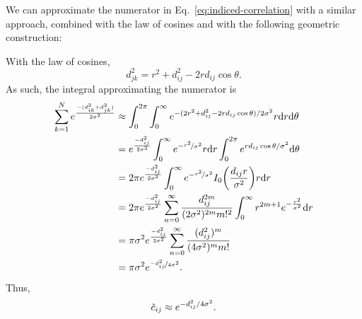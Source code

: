 \documentclass{article}
\begin{document}
We can approximate the numerator in Eq.~\eqref{eq:indiced-correlation} with a similar approach, combined with the law of cosines and with the following geometric construction:
%
\begin{center}
\end{center}

With the law of cosines, 
\begin{equation*}
    d_{jk}^2 = r^2+d_{ij}^2-2rd_{ij}\cos\theta.
\end{equation*}
As such, the integral approximating the numerator is
\begin{align*}
    \sum_{k = 1}^N e^{\frac{-(d_{ik}^2+d_{jk}^2)}{2\sigma^2}} &\approx \int_{0}^{2\pi}\int_0^{\infty}e^{-(2r^2+d_{ij}^2-2rd_{ij}\cos\theta)/2\sigma^2}r\dd r\dd \theta\\
    &= e^{\frac{-d_{ij}^2}{2\sigma^2}}\int_0^{\infty}e^{-\nicefrac{r^2}{\sigma^2}}r\dd r\int_{0}^{2\pi}e^{rd_{ij}\cos\theta/\sigma^2}\dd \theta\\
    &= 2\pi e^{\frac{-d_{ij}^2}{2\sigma^2}}\int_0^{\infty}e^{-\nicefrac{r^2}{\sigma^2}}I_0\qty(\frac{d_{ij}r}{\sigma^2})r\dd r\\
    &= 2\pi e^{\frac{-d_{ij}^2}{2\sigma^2}} \sum_{n=0}^\infty \frac{d_{ij}^{2m}}{(2\sigma^2)^{2m} m!^2}\int_0^\infty r^{2m+1} e^{-\frac{r^2}{\sigma^2}} \dd r\\
    &= \pi \sigma^2 e^{\frac{-d_{ij}^2}{2\sigma^2}} \sum_{n=0}^\infty \frac{(d_{ij}^{2})^{m}}{(4\sigma^2)^{m} m!}\\
    &= \pi \sigma^2 e^{\nicefrac{-d_{ij}^2}{4\sigma^2}}.
\end{align*}
Thus,
\begin{align*}
    \Tilde{c}_{ij} \approx e^{-d_{ij}^2/4\sigma^2}.
\end{align*}
\end{document}
